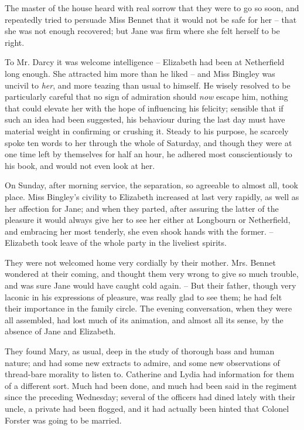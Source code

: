 The master of the house heard with real sorrow that
they were to go so soon, and repeatedly tried to persuade
Miss Bennet that it would not be safe for her -- that she
was not enough recovered; but Jane was firm where she
felt herself to be right.

To Mr. Darcy it was welcome intelligence -- Elizabeth
had been at Netherfield long enough. She attracted him
more than he liked -- and Miss Bingley was uncivil to \textit{her},
and more teazing than usual to himself. He wisely
resolved to be particularly careful that no sign of admiration
should \textit{now} escape him, nothing that could elevate
her with the hope of influencing his felicity; sensible that
if such an idea had been suggested, his behaviour during
the last day must have material weight in confirming or
crushing it. Steady to his purpose, he scarcely spoke ten
words to her through the whole of Saturday, and though
they were at one time left by themselves for half an hour,
he adhered most conscientiously to his book, and would
not even look at her.

On Sunday, after morning service, the separation, so
agreeable to almost all, took place. Miss Bingley’s civility
to Elizabeth increased at last very rapidly, as well as her
affection for Jane; and when they parted, after assuring
the latter of the pleasure it would always give her to see her
either at Longbourn or Netherfield, and embracing her most
tenderly, she even shook hands with the former. -- Elizabeth
took leave of the whole party in the liveliest spirits.

They were not welcomed home very cordially by their
mother. Mrs. Bennet wondered at their coming, and
thought them very wrong to give so much trouble, and
was sure Jane would have caught cold again. -- But their
father, though very laconic in his expressions of pleasure,
was really glad to see them; he had felt their importance
in the family circle. The evening conversation, when they
were all assembled, had lost much of its animation, and
almost all its sense, by the absence of Jane and Elizabeth.

They found Mary, as usual, deep in the study of thorough
bass and human nature; and had some new extracts to
admire, and some new observations of thread-bare morality
to listen to. Catherine and Lydia had information for
them of a different sort. Much had been done, and much
had been said in the regiment since the preceding Wednesday;
several of the officers had dined lately with their
uncle, a private had been flogged, and it had actually
been hinted that Colonel Forster was going to be married.

